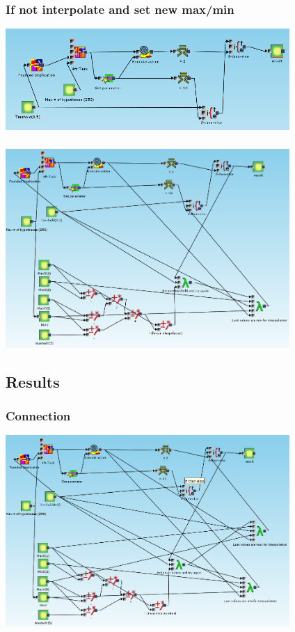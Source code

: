 \documentclass{beamer}
\begin{document}
\begin{frame}
	\frametitle{If not interpolate and set new max/min}
	\includegraphics[width=10.8cm]{exampleMainMiningPart}
\end{frame}

\begin{frame}
	\frametitle{}
	\includegraphics[width=10.8cm]{exampleWithoutInterpolationOnMax}
\end{frame}

\subsection{Results}
\begin{frame}
	\frametitle{Connection}
	\includegraphics[width=10.8cm]{exampleResult}
\end{frame}
\end{document}
